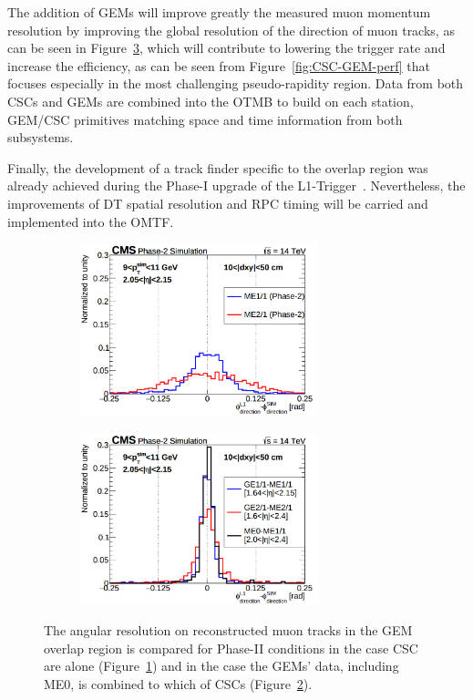 	The addition of GEMs will improve greatly the measured muon momentum resolution by improving the global resolution of the direction of muon tracks, as can be seen in Figure~\ref{fig:CSC-GEM-res}, which will contribute to lowering the trigger rate and increase the efficiency, as can be seen from Figure~\ref{fig:CSC-GEM-perf} that focuses especially in the most challenging pseudo-rapidity region. Data from both CSCs and GEMs are combined into the OTMB to build on each station, GEM/CSC primitives matching space and time information from both subsystems.
	
	Finally, the development of a track finder specific to the overlap region was already achieved during the Phase-I upgrade of the L1-Trigger~\cite{L1UPGRADE2016}. Nevertheless, the improvements of DT spatial resolution and RPC timing will be carried and implemented into the OMTF.
	
	\begin{figure}[H]
		\begin{subfigure}{0.5\linewidth}
			\centering
			\includegraphics[height=5cm]{fig/chapt3/CSC-angular-res.png}
			\caption{\label{fig:CSC-GEM-res:A}}
		\end{subfigure}
		\begin{subfigure}{0.5\linewidth}
			\centering
			\includegraphics[height=5cm]{fig/chapt3/GEM-angular-res.png}
			\caption{\label{fig:CSC-GEM-res:B}}
		\end{subfigure}
		\caption{\label{fig:CSC-GEM-res} The angular resolution on reconstructed muon tracks in the GEM overlap region  is compared for Phase-II conditions in the case CSC are alone (Figure~\ref{fig:CSC-GEM-res:A}) and in the case the GEMs' data, including ME0, is combined to which of CSCs (Figure~\ref{fig:CSC-GEM-res:B}).}
	\end{figure}
	
